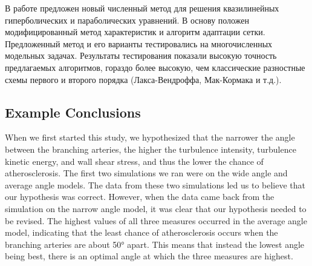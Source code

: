 \documentclass[a4paper, 12pt]{article}
\begin{document}
В работе предложен новый численный метод для решения квазилинейных 
гиперболических и параболических уравнений. В основу положен модифицированный 
метод характеристик и алгоритм адаптации сетки. Предложенный метод и его 
варианты тестировались на многочисленных модельных задачах. Результаты 
тестирования показали высокую точность предлагаемых алгоритмов, гораздо более 
высокую, чем классические разностные схемы первого и второго порядка 
(Лакса-Вендроффа, Мак-Кормака и т.д.).

\subsection*{Example Conclusions}

When we first started this study, we hypothesized that the narrower the angle 
between the branching arteries, the higher the turbulence intensity, turbulence
kinetic energy, and wall shear stress, and thus the lower the chance of 
atherosclerosis. The first two simulations we ran were on the wide angle and 
average angle models. The data from these two simulations led us to believe 
that our hypothesis was correct. However, when the data came back from the 
simulation on the narrow angle model, it was clear that our hypothesis needed 
to be revised. The highest values of all three measures occurred in the average
angle model, indicating that the least chance of atherosclerosis occurs when
the branching arteries are about 50° apart. This means that instead the lowest 
angle being best, there is an optimal angle at which the three measures are 
highest.\\
\end{document}
